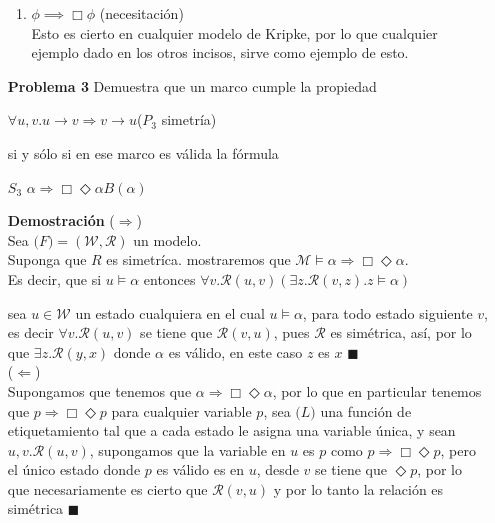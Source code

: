 \documentclass{article}
\begin{document}
\begin{enumerate}
\begin{enumerate}
\item $\phi \implies \Box\phi$ (necesitación)\\
  Esto es cierto en cualquier modelo de Kripke, por lo que cualquier ejemplo dado en los otros incisos, sirve como ejemplo de esto.

\end{enumerate}

\item[\bf{Problema 3}]Demuestra que un marco cumple la propiedad\\

\begin{center}
  $ \forall u,v. u \rightarrow v \Rightarrow  v \rightarrow  u $\hspace{2 cm}($P_3$ simetría)
\end{center}
si y sólo si en ese marco es válida la fórmula
\begin{center}
  $S_3$  $\alpha \Rightarrow \Box\Diamond\alpha$\hspace{2 cm}$B(\alpha)$
\end{center}

\item[\bf{Demostración}]
($\Rightarrow$)\\
Sea $\mathcal(F)=(\mathcal{W},\mathcal{R})$ un modelo.\\
Suponga que $R$ es simetríca.
mostraremos que $\mathcal{M} \models \alpha \Rightarrow  \Box\Diamond \alpha$.\\
Es decir, que si $u \models \alpha$ entonces $\forall v. \mathcal{R}(u,v) (\exists z .\mathcal{R}(v,z).  z\models \alpha)$ 

sea $u\in \mathcal{W}$ un estado cualquiera en el cual $u \models \alpha$, para todo estado siguiente $v$, es decir $\forall v . \mathcal{R}(u,v)$ se tiene que $\mathcal{R}(v,u)$, pues $\mathcal{R}$ es simétrica, así, por lo que $\exists z. \mathcal{R}(y,x)$ donde $\alpha$ es válido, en este caso $z$ es $x$ $\blacksquare$ \\
($\Leftarrow$)\\
Supongamos que tenemos que $\alpha \Rightarrow \Box\Diamond\alpha$, por lo que en particular tenemos que $p \Rightarrow \Box\Diamond p$ para cualquier variable $p$, sea $\mathcal(L)$ una función de etiquetamiento tal que a cada estado le asigna una variable única, y sean $u,v . \mathcal{R}(u,v)$, supongamos que la variable en $u$ es $p$ como  $p \Rightarrow \Box\Diamond p$, pero el único estado donde $p$ es válido es en $u$, desde $v$ se tiene que $\Diamond p$, por lo que necesariamente es cierto que $\mathcal{R}(v,u)$ y por lo tanto la relación es simétrica $\blacksquare$



\end{enumerate}
\end{document}
